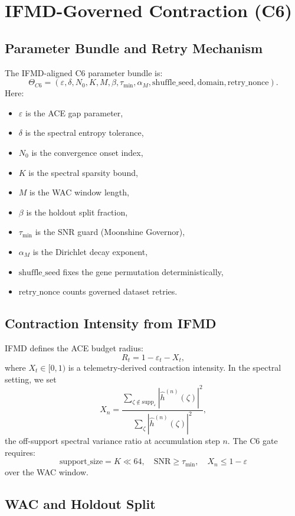 \documentclass[11pt]{article}
\begin{document}
\section{IFMD-Governed Contraction (C6)}

\subsection{Parameter Bundle and Retry Mechanism}

The IFMD-aligned C6 parameter bundle is:
\[
  \Theta_{C6} = (\varepsilon, \delta, N_0, K, M, \beta, \tau_{\min},
  \alpha_M, \text{shuffle\_seed}, \text{domain}, \text{retry\_nonce}).
\]
Here:
\begin{itemize}[noitemsep]
  \item $\varepsilon$ is the ACE gap parameter,
  \item $\delta$ is the spectral entropy tolerance,
  \item $N_0$ is the convergence onset index,
  \item $K$ is the spectral sparsity bound,
  \item $M$ is the WAC window length,
  \item $\beta$ is the holdout split fraction,
  \item $\tau_{\min}$ is the SNR guard (Moonshine Governor),
  \item $\alpha_M$ is the Dirichlet decay exponent,
  \item $\text{shuffle\_seed}$ fixes the gene permutation deterministically,
  \item $\text{retry\_nonce}$ counts governed dataset retries.
\end{itemize}

\subsection{Contraction Intensity from IFMD}

IFMD defines the ACE budget radius:
\[
  R_t = 1 - \varepsilon_t - X_t,
\]
where $X_t \in [0,1)$ is a telemetry-derived contraction intensity.
In the spectral setting, we set
\[
  X_n = \frac{\sum_{\zeta \notin \text{supp}_\varepsilon}
    |\hat{h}^{(n)}(\zeta)|^2}
  {\sum_{\zeta} |\hat{h}^{(n)}(\zeta)|^2},
\]
the off-support spectral variance ratio at accumulation step $n$.
The C6 gate requires:
\[
  \text{support\_size} = K \ll 64, \quad
  \text{SNR} \ge \tau_{\min}, \quad
  X_n \le 1 - \varepsilon
\]
over the WAC window.

\subsection{WAC and Holdout Split}
\end{document}

